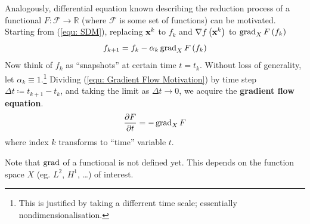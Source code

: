 \documentclass[../dissertation.tex]{subfiles}
\begin{document}
Analogously, differential equation known describing the reduction process of a functional $F:\mathcal{F} \rightarrow \mathbb{R}$ (where $\mathcal{F}$ is some set of functions) can be motivated.
Starting from (\ref{equ: SDM}), replacing $\mathbf{x}^{k}$ to $f_k$ and $\nabla f\left( \mathbf{x}^k \right)$ to $\operatorname{grad}_X F\left( f_k \right)$
\begin{equation}
    f_{k+1} = f_k - \alpha_k \operatorname{grad}_X F \left( f_k \right)
    \label{equ: Gradient Flow Motivation}
\end{equation}
Now think of $f_k$ as ``snapshots'' at certain time $t = t_k$.
Without loss of generality, let $\alpha_k \equiv 1$.\footnote{
This is justified by taking a differrent time scale; essentially nondimensionalisation.}
Dividing (\ref{equ: Gradient Flow Motivation}) by time step $\Delta t \coloneqq t_{k+1} - t_k$,
and taking the limit as $\Delta t \rightarrow 0$,
we acquire the \textbf{gradient flow equation}\cite{YSC2021}.
\begin{equation}
    \frac{\partial F}{\partial t} = - \operatorname{grad}_X F
\end{equation}
where index $k$ transforms to ``time'' variable $t$.

Note that $\operatorname{grad}$ of a functional is not defined yet. This depends on the function space $X$ (eg. $L^2$, $H^1$, \ldots) of interest.
\end{document}
